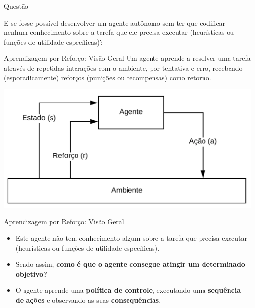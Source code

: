\documentclass{beamer}
\begin{document}
\begin{frame}{Questão}

	E se fosse possível desenvolver um agente autônomo sem ter que codificar nenhum
	conhecimento sobre a tarefa que ele precisa executar (heurísticas ou funções de utilidade específicas)?

\end{frame}


\begin{frame}{Aprendizagem por Reforço: Visão Geral}
	\small
	Um agente aprende a resolver uma tarefa através de repetidas interações com o ambiente, por tentativa e erro, recebendo 
	(esporadicamente) reforços (punições ou recompensas) como retorno.
  \begin{center}
	\includegraphics[width=.7\textwidth]{figuras/visaoGeral.png}
\end{center}

\end{frame}

\begin{frame}{Aprendizagem por Reforço: Visão Geral}
	\begin{itemize}
	\item<1-> Este agente não tem conhecimento algum sobre a tarefa que precisa executar (heurísticas ou funções de utilidade específicas).
	\item<2-> Sendo assim, \textbf{{\color{red}como é que o agente consegue atingir um determinado objetivo?}}
	\item<3-> O agente aprende uma \textbf{política de controle}, executando uma \textbf{sequência de ações} e observando as suas \textbf{consequências}.
	
	\end{itemize}
\end{frame}
	
\end{document}
